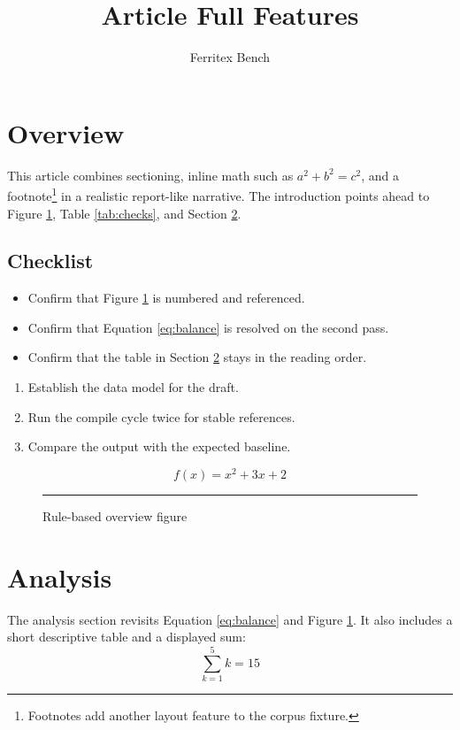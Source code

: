 \documentclass{article}
\title{Article Full Features}
\author{Ferritex Bench}
\begin{document}
\maketitle
\tableofcontents

\section{Overview}\label{sec:overview}
This article combines sectioning, inline math such as $a^2 + b^2 = c^2$, and a footnote\footnote{Footnotes add another layout feature to the corpus fixture.} in a realistic report-like narrative. The introduction points ahead to Figure \ref{fig:system}, Table \ref{tab:checks}, and Section \ref{sec:analysis}.

\subsection{Checklist}
\begin{itemize}
\item Confirm that Figure \ref{fig:system} is numbered and referenced.
\item Confirm that Equation \ref{eq:balance} is resolved on the second pass.
\item Confirm that the table in Section \ref{sec:analysis} stays in the reading order.
\end{itemize}

\begin{enumerate}
\item Establish the data model for the draft.
\item Run the compile cycle twice for stable references.
\item Compare the output with the expected baseline.
\end{enumerate}

\begin{equation}\label{eq:balance}
f(x) = x^2 + 3x + 2
\end{equation}

\begin{figure}[h]
\begin{center}
\rule{4.5in}{2in}
\end{center}
\caption{Rule-based overview figure}
\label{fig:system}
\end{figure}

\section{Analysis}\label{sec:analysis}
The analysis section revisits Equation \ref{eq:balance} and Figure \ref{fig:system}. It also includes a short descriptive table and a displayed sum:
\[
\sum_{k=1}^{5} k = 15
\]
\end{document}
